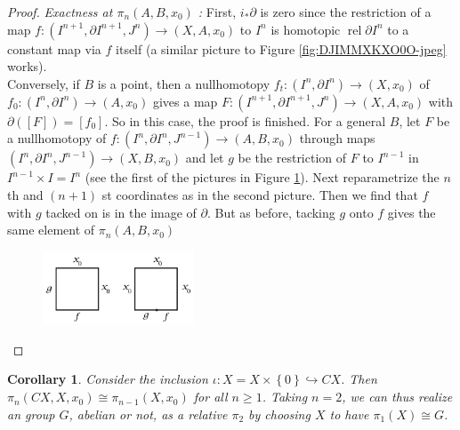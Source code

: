 \documentclass[reqno]{amsart}
\newtheorem{corollary}[theorem]{Corollary}
\theoremstyle{definition}
\theoremstyle{remark}
\DeclareMathOperator{\rel}{rel}
\begin{document}
\begin{proof}
      \textit{Exactness at $\pi_n (A,B,x_0)$ :} 
      First, $i_* \partial$ is zero since
      the restriction of a map
      $f \colon \left( I^{n+1}, \partial I^{n+1},
      J^{n}\right) \to \left( X,A,x_0 \right) $ 
      to $I^{n}$ is homotopic $\rel \partial I^{n}$ to a 
      constant map via $f$ itself (a similar picture
      to Figure \ref{fig:DJIMMXKXO0O-jpeg} works).\\
      Conversely, if $B$ is a point, then
      a nullhomotopy $f_t \colon
      \left( I^{n}, \partial I^{n} \right) 
      \to \left( X, x_0 \right) $ of
      $f_0 \colon \left( I^{n},\partial I^{n} \right) 
      \to \left( A,x_0 \right) $ gives a map
      $F \colon \left( I^{n+1},\partial I^{n+1},J^{n} \right) 
      \to \left( X,A,x_0 \right) $ with
      $\partial \left( \left[ F \right]  \right) 
      = \left[ f_0 \right] $. So in this case, the proof is
      finished.
      For a general $B$, let
      $F$ be a nullhomotopy of
      $f \colon \left( I^{n},\partial I^{n},J^{n-1} \right) 
      \to \left( A,B,x_0 \right) $ through maps
      $\left( I^{n}, \partial I^{n}, J^{n-1} \right) 
      \to \left( X,B,x_0 \right) $ and
      let $g$ be the restriction of
      $F$ to $I^{n-1}$ in $I^{n-1} \times I = I^{n}$ (see
      the first of the pictures in
      Figure \ref{fig:USIIOOQ-png}).
      Next reparametrize the $n$ th and
      $(n+1)$ st coordinates as in the
      second picture. Then 
       we find that $f$ with $g$ tacked on
       is in the image of $\partial$. But
       as before, tacking $g$ onto $f$ gives the
       same element of $\pi_n (A,B,x_0)$

      \begin{figure}[htpb]
          \centering
          \includegraphics[width=0.4\textwidth]{Figures/USIIOOQ.png}
          \caption{}
          \label{fig:USIIOOQ-png}
      \end{figure}
  \end{proof}

  
\begin{corollary}
    Consider the inclusion
    $\iota \colon X = X \times \left\{ 0 \right\} 
    \hookrightarrow CX$.
    Then
    $\pi_n \left( CX, X, x_0 \right) 
    \cong \pi_{n-1}\left( X, x_0 \right) $ for all
    $n\ge 1$. Taking
    $n=2$, we can thus realize an group $G$, abelian
    or not, as a relative $\pi_2$ by
    choosing $X$ to have $\pi_1 (X) \cong G$.
\end{corollary}
\end{document}
